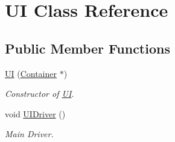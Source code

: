 \hypertarget{class_u_i}{}\section{U\+I Class Reference}
\label{class_u_i}
\subsection*{Public Member Functions}
\begin{DoxyCompactItemize}
\item 
\hyperlink{class_u_i_ac9d77b1a557738fcaf0d97fe05881a9f}{U\+I} (\hyperlink{class_container}{Container} $\ast$)
\begin{DoxyCompactList}\small\item\em Constructor of \hyperlink{class_u_i}{U\+I}. \end{DoxyCompactList}\item 
void \hyperlink{class_u_i_ac4633d40eeaf1c9e492549b5b1220cf8}{U\+I\+Driver} ()
\begin{DoxyCompactList}\small\item\em Main Driver. \end{DoxyCompactList}\end{DoxyCompactItemize}
